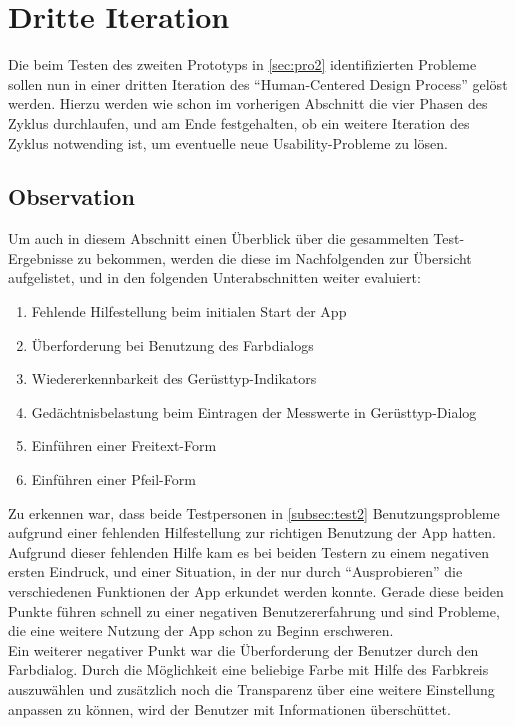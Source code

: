 \section{Dritte Iteration}\label{sec:pro3}
Die beim Testen des zweiten Prototyps in \autoref{sec:pro2} identifizierten Probleme sollen nun in einer dritten Iteration des ``Human-Centered Design Process'' gelöst werden.
Hierzu werden wie schon im vorherigen Abschnitt die vier Phasen des Zyklus durchlaufen, und am Ende festgehalten, ob ein weitere Iteration des Zyklus notwending ist, um eventuelle neue Usability-Probleme zu lösen.

\subsection{Observation}\label{subsec:obs3}

Um auch in diesem Abschnitt einen Überblick über die gesammelten Test-Ergebnisse zu bekommen, werden die diese im Nachfolgenden zur Übersicht aufgelistet, und in den folgenden Unterabschnitten weiter evaluiert:

\begin{enumerate}
  \item Fehlende Hilfestellung beim initialen Start der App
  \item Überforderung bei Benutzung des Farbdialogs
  \item Wiedererkennbarkeit des Gerüsttyp-Indikators
  \item Gedächtnisbelastung beim Eintragen der Messwerte in Gerüsttyp-Dialog
  \item Einführen einer Freitext-Form
  \item Einführen einer Pfeil-Form 
\end{enumerate}

Zu erkennen war, dass beide Testpersonen in \autoref{subsec:test2} Benutzungsprobleme aufgrund einer fehlenden Hilfestellung zur richtigen Benutzung der App hatten.
Aufgrund dieser fehlenden Hilfe kam es bei beiden Testern zu einem negativen ersten Eindruck, und einer Situation, in der nur durch ``Ausprobieren'' die verschiedenen Funktionen der App erkundet werden konnte.
Gerade diese beiden Punkte führen schnell zu einer negativen Benutzererfahrung und sind Probleme, die eine weitere Nutzung der App schon zu Beginn erschweren. \\

Ein weiterer negativer Punkt war die Überforderung der Benutzer durch den Farbdialog.
Durch die Möglichkeit eine beliebige Farbe mit Hilfe des Farbkreis auszuwählen und zusätzlich noch die Transparenz über eine weitere Einstellung anpassen zu können, wird der Benutzer mit Informationen überschüttet. \\

